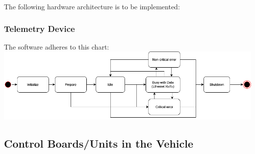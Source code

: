 The following hardware architecture is to be implemented:

\subsubsection{Telemetry Device}
The software adheres to this chart:
\includegraphics[width=\textwidth]{texfiles/elec/eimg/telemetrystate.png}

\subsection{Control Boards/Units in the Vehicle}


